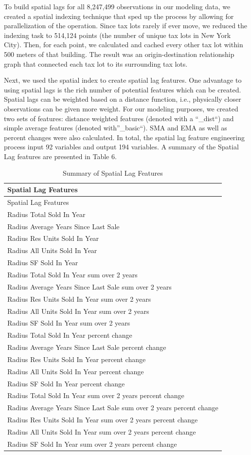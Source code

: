 \documentclass[]{article}
\begin{document}
To build spatial lags for all 8,247,499 observations in our modeling
data, we created a spatial indexing technique that sped up the process
by allowing for parallelization of the operation. Since tax lots rarely
if ever move, we reduced the indexing task to 514,124 points (the number
of unique tax lots in New York City). Then, for each point, we
calculated and cached every other tax lot within 500 meters of that
building. The result was an origin-destination relationship graph that
connected each tax lot to its surrounding tax lots.

Next, we used the spatial index to create spatial lag features. One
advantage to using spatial lags is the rich number of potential features
which can be created. Spatial lags can be weighted based on a distance
function, i.e., physically closer observations can be given more weight.
For our modeling purposes, we created two sets of features: distance
weighted features (denoted with a ``\_dist``) and simple average
features (denoted with''\_basic``). SMA and EMA as well as percent
changes were also calculated. In total, the spatial lag feature
engineering process input 92 variables and output 194 variables. A
summary of the Spatial Lag features are presented in Table 6.

\begin{longtable}[]{@{}l@{}}
\caption{Summary of Spatial Lag Features}\tabularnewline
\toprule
Spatial Lag Features\tabularnewline
\midrule
\endfirsthead
\toprule
Spatial Lag Features\tabularnewline
\midrule
\endhead
Radius Total Sold In Year\tabularnewline
Radius Average Years Since Last Sale\tabularnewline
Radius Res Units Sold In Year\tabularnewline
Radius All Units Sold In Year\tabularnewline
Radius SF Sold In Year\tabularnewline
Radius Total Sold In Year sum over 2 years\tabularnewline
Radius Average Years Since Last Sale sum over 2 years\tabularnewline
Radius Res Units Sold In Year sum over 2 years\tabularnewline
Radius All Units Sold In Year sum over 2 years\tabularnewline
Radius SF Sold In Year sum over 2 years\tabularnewline
Radius Total Sold In Year percent change\tabularnewline
Radius Average Years Since Last Sale percent change\tabularnewline
Radius Res Units Sold In Year percent change\tabularnewline
Radius All Units Sold In Year percent change\tabularnewline
Radius SF Sold In Year percent change\tabularnewline
Radius Total Sold In Year sum over 2 years percent change\tabularnewline
Radius Average Years Since Last Sale sum over 2 years percent
change\tabularnewline
Radius Res Units Sold In Year sum over 2 years percent
change\tabularnewline
Radius All Units Sold In Year sum over 2 years percent
change\tabularnewline
Radius SF Sold In Year sum over 2 years percent change\tabularnewline
\bottomrule
\end{longtable}
\end{document}
